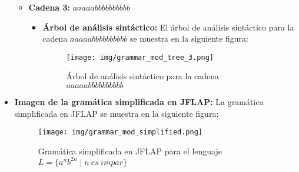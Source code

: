 \documentclass[11pt]{report}
\begin{document}
\begin{itemize}
\begin{itemize}
    \newpage
    
    \item \textbf{Cadena 3:} $aaaaabbbbbbbbbb$
    \begin{itemize}
      \item \textbf{Árbol de análisis sintáctico:} El árbol de análisis sintáctico para la cadena $aaaaabbbbbbbbbb$ se muestra en la siguiente figura:
      \begin{figure}[H]
        \centering
        \texttt{[image: img/grammar\_mod\_tree\_3.png]}
        \caption{Árbol de análisis sintáctico para la cadena $aaaaabbbbbbbbbb$}
        \label{fig:arbol12}
      \end{figure}
    \end{itemize}
  \end{itemize}

    \newpage
  
  \item \textbf{Imagen de la gramática simplificada en JFLAP:} La gramática simplificada en JFLAP se muestra en la siguiente figura:
  \begin{figure}[H]
    \centering
      \texttt{[image: img/grammar\_mod\_simplified.png]}
    \caption{Gramática simplificada en JFLAP para el lenguaje $L = \{a^n b^{2n} \mid n \ es \ impar\}$}
  \end{figure}
\end{itemize}
\end{document}
